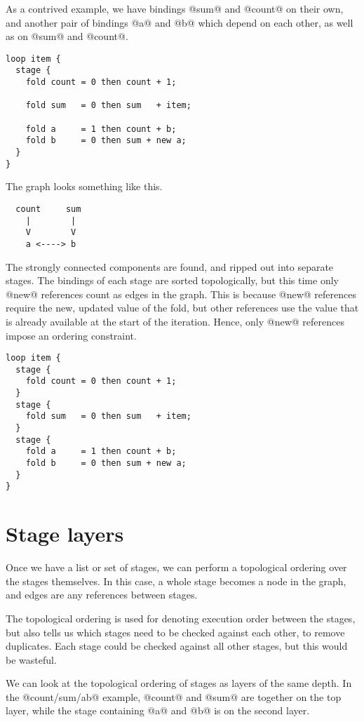 As a contrived example, we have bindings @sum@ and @count@ on their own, and another pair of bindings @a@ and @b@ which depend on each other, as well as on @sum@ and @count@.
\begin{lstlisting}
loop item {
  stage {
    fold count = 0 then count + 1;

    fold sum   = 0 then sum   + item;

    fold a     = 1 then count + b;
    fold b     = 0 then sum + new a;
  }
}
\end{lstlisting}

The graph looks something like this.
\begin{lstlisting}
  count     sum
    |        |
    V        V
    a <----> b
\end{lstlisting}

The strongly connected components are found, and ripped out into separate stages.
The bindings of each stage are sorted topologically, but this time only @new@ references count as edges in the graph.
This is because @new@ references require the new, updated value of the fold, but other references use the value that is already available at the start of the iteration.
Hence, only @new@ references impose an ordering constraint.
\begin{lstlisting}
loop item {
  stage {
    fold count = 0 then count + 1;
  }
  stage {
    fold sum   = 0 then sum   + item;
  }
  stage {
    fold a     = 1 then count + b;
    fold b     = 0 then sum + new a;
  }
}
\end{lstlisting}

\section{Stage layers}
Once we have a list or set of stages, we can perform a topological ordering over the stages themselves.
In this case, a whole stage becomes a node in the graph, and edges are any references between stages.

The topological ordering is used for denoting execution order between the stages, but also tells us which stages need to be checked against each other, to remove duplicates.
Each stage could be checked against all other stages, but this would be wasteful.

We can look at the topological ordering of stages as layers of the same depth.
In the @count/sum/ab@ example, @count@ and @sum@ are together on the top layer, while the stage containing @a@ and @b@ is on the second layer.

